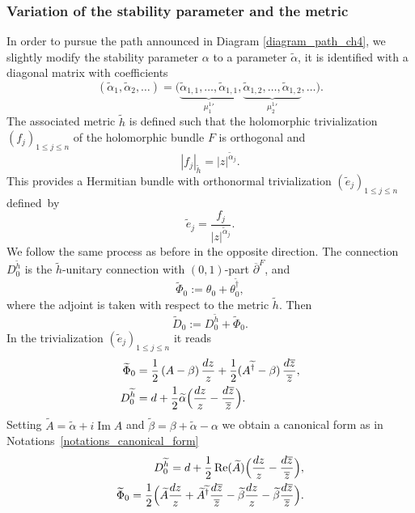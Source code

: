\documentclass[11pt]{article}
\theoremstyle{definition}
\theoremstyle{plain}
\DeclareMathOperator{\Imm}{Im}
\DeclareMathOperator{\Ree}{Re}
\begin{document}
\subsubsection{Variation of the stability parameter and the metric}\label{subsect_local_variation_metric}
In order to pursue the path announced in Diagram \eqref{diagram_path_ch4}, we slightly modify the stability parameter $\alpha$ to a parameter $\widetilde{\alpha}$, it is identified with a diagonal matrix with coefficients
\[
(\widetilde{\alpha}_1,\widetilde{\alpha}_2,\dots)=\bigl(\underbrace{\widetilde{\alpha}_{1,1},\dots, \widetilde{\alpha}_{1,1}}_{{\mu^1_1}' }, \underbrace{\widetilde{\alpha}_{1,2},\dots, \widetilde{\alpha}_{1,2}}_{ {\mu^1_2}'}, \dots \bigr).
\]
The associated metric $\widetilde{h}$ is defined such that the holomorphic trivialization $(f_j)_{1\le j\le n}$ of the holomorphic bundle $F$ is orthogonal and
\[
|f_j|_{\widetilde{h}} =|z|^{\widetilde{\alpha}_j}.
\]
This provides a Hermitian bundle with orthonormal trivialization $(\widetilde{e}_j)_{1\le j\le n}$ defined~by
\[
\widetilde{e}_j = \frac{f_j}{|z|^{\widetilde{\alpha}_j}}.
\]
We follow the same process as before in the opposite direction. The connection $D_0^{\widetilde{h}}$ is the $\widetilde{h}$-unitary connection with $(0,1)$-part $\overline{\partial}^F$, and
\[
\widetilde{\Phi}_0 := \theta_0 + \theta_0^{\widetilde{\dagger}},
\]
where the adjoint is taken with respect to the metric $\widetilde{h}$. Then
\[
\widetilde{D}_0 := D_0^{\widetilde{h}} + \widetilde{\Phi}_0.
\]
In the trivialization $(\widetilde{e}_j)_{1\le j\le n}$ it reads
\begin{align*}
\widetilde{\Phi}_0 &= \frac{1}{2}\left(A-\beta\right)\frac{d z}{z} + \frac{1}{2}(A^{\widetilde{\dagger}}-\beta)\,\frac{d \overline{z}}{\overline{z}}, \\
D_0^{\widetilde{h}} &= d + \frac{1}{2}\widetilde{\alpha} \Bigl(\frac{d z}{z}-\frac{d\overline{z}}{\overline{z}}\Bigr).
\end{align*}
Setting $\widetilde{A}= \widetilde{\alpha}+i \Imm A$ and $\widetilde{\beta}= \beta + \widetilde{\alpha} - \alpha$ we obtain a canonical form as in Notations~\ref{notations_canonical_form}
\begin{align*}
D_0^{\widetilde{h}}= d + \frac{1}{2}\Ree(\widetilde{A})\Bigl(\frac{d z}{z}-\frac{d \overline{z}}{\overline{z}}\Bigr), \\
\widetilde{\Phi}_0 = \frac{1}{2}\Bigl(\widetilde{A}\frac{d z}{z} + \widetilde{A}^{\widetilde{\dagger}}\frac{d\overline{z}}{\overline{z}} - \widetilde{\beta} \frac{d z}{z} - \widetilde{\beta} \frac{d \overline{z}}{\overline{z}}\Bigr).
\end{align*}
\end{document}
